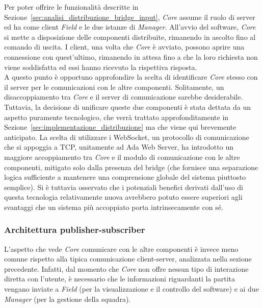 Per poter offrire le funzionalità descritte in Sezione~\ref{sec:analisi_distribuzione_bridge_input}, \textit{Core} assume il ruolo di server ed ha come client \textit{Field} e le due istanze di \textit{Manager}. All'avvio del software, \textit{Core} si mette a disposizione delle componenti distribuite, rimanendo in ascolto fino al comando di uscita. I client, una volta che \textit{Core} è avviato, possono aprire una connessione con quest'ultimo, rimanendo in attesa fino a che la loro richiesta non viene soddisfatta ed essi hanno ricevuto la rispettiva risposta.\\

A questo punto è opportuno approfondire la scelta di identificare \emph{Core} stesso con il server per le comunicazioni con le altre componenti. Solitamente, un disaccoppiamento tra \emph{Core} e il server di comunicazione sarebbe desiderabile. Tuttavia, la decisione di unificare queste due componenti è stata dettata da un aspetto puramente tecnologico, che verrà trattato approfonditamente in Sezione~\ref{sec:implementazione_distribuzione} ma che viene qui brevemente anticipato. La scelta di utilizzare i WebSocket, un protocollo di comunicazione che si appoggia a TCP, unitamente ad Ada Web Server, ha introdotto un maggiore accoppiamento tra \emph{Core} e il modulo di comunicazione con le altre componenti, mitigato solo dalla presenza del bridge (che fornisce una separazione logica sufficiente a mantenere una comprensione globale del sistema piuttosto semplice). Si è tuttavia osservato che i potenziali benefici derivati dall'uso di questa tecnologia relativamente nuova avrebbero potuto essere superiori agli svantaggi che un sistema più accoppiato porta intrinsecamente con sé.\\

\subsubsection{Architettura publisher-subscriber}
\label{sec:analisi_client_pusblisher_subscriber}

L'aspetto che vede \textit{Core} comunicare con le altre componenti è invece meno comune rispetto alla tipica comunicazione client-server, analizzata nella sezione precedente. Infatti, dal momento che \textit{Core} non offre nessun tipo di interazione diretta con l'utente, è necessario che le informazioni riguardanti la partita vengano inviate a \textit{Field} (per la visualizzazione e il controllo del software) e ai due \textit{Manager} (per la gestione della squadra).\\

